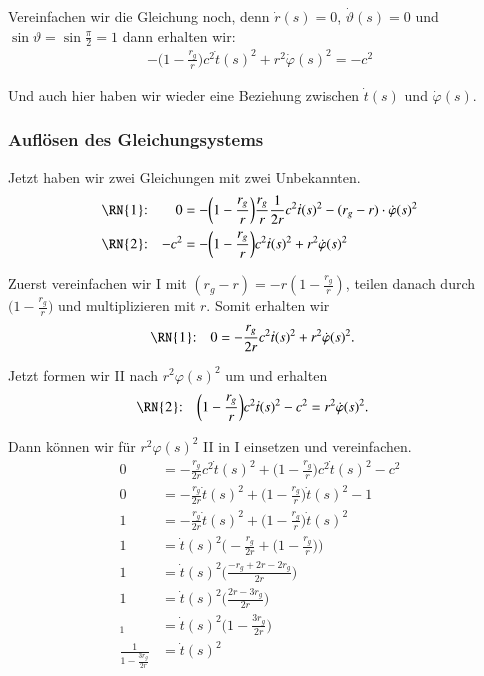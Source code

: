 \begin{refsection}
\noindent{}Vereinfachen wir die Gleichung noch, denn \( \dot r(s) = 0 \), \( \dot \vartheta(s) = 0 \) und \( \sin \vartheta = \sin \frac{\pi}{2} = 1 \) dann erhalten wir:
\begin{align*}
-\biggl(1-\frac{r_g}r\biggr)c^2 \dot t(s)^2 + r^2 \dot \varphi (s)^2 = -c^2 
\end{align*}

\noindent{}Und auch hier haben wir wieder eine Beziehung zwischen \( \dot t(s) \) und \( \dot \varphi(s) \). 

\subsubsection{Auflösen des Gleichungsystems}
Jetzt haben wir zwei Gleichungen mit zwei Unbekannten.
\begin{align*}
\text{\RN{1}:} &&
0 &= -\biggl(1-\frac{r_g}{r}\biggr)\frac{r_g}{r}\frac1{2r}c^2\dot t(s)^2 - (r_g-r)\cdot \dot \varphi(s)^2
\\
\text{\RN{2}:} &&
-c^2 &= -\biggl(1-\frac{r_g}r\biggr)c^2 \dot t(s)^2 + r^2 \dot \varphi (s)^2
\end{align*}

\noindent{}Zuerst vereinfachen wir \RN{1} mit $ (r_g - r) = -r (1 - \frac{r_g}{r} )$, teilen danach durch $\biggr( 1 - \frac{r_g}{r} \biggr)$ und multiplizieren mit $r$. Somit erhalten wir
\begin{align*}
\text{\RN{1}:} && 0 &= -\frac{r_g}{2r} c^2 \dot t(s)^2 + r^2 \dot \varphi(s)^2.
\end{align*}

\noindent{}Jetzt formen wir \RN{2} nach $ r^2 \varphi(s)^2$ um und erhalten 
\begin{align*}
\text{\RN{2}:} && \biggr( 1 - \frac{r_g}{r} \biggr) c^2 \dot t(s)^2 - c^2 &= r^2 \dot \varphi (s)^2.
\end{align*}

\noindent{}Dann können wir für $ r^2 \varphi(s)^2$ \RN{2} in \RN{1} einsetzen und vereinfachen.
\begin{align*}
0 &= -\frac{r_g}{2r} c^2 \dot t(s)^2 + \biggr( 1 - \frac{r_g}{r} \biggr) c^2 \dot t(s)^2 - c^2  
\\
0 &= -\frac{r_g}{2r}\dot t(s)^2 + \biggr( 1 - \frac{r_g}{r} \biggr) \dot t(s)^2 - 1 
\\
1 &= -\frac{r_g}{2r}\dot t(s)^2 + \biggr( 1 - \frac{r_g}{r} \biggr) \dot t(s)^2
\\
1 &= \dot t(s)^2 \biggr( -\frac{r_g}{2r} + \biggr( 1 - \frac{r_g}{r} \biggr) \biggr) 
\\
1 &= \dot t(s)^2 \biggr( \frac{-r_g + 2r - 2r_g}{2r}\biggr)
\\
1 &= \dot t(s)^2 \biggr( \frac{2r-3r_g}{2r}\biggr)
\\_
1 &= \dot t(s)^2 \biggr( 1 - \frac{3r_g}{2r}\biggr) 
\\
\frac{1}{ 1 - \frac{3r_g}{2r} } &= \dot t(s)^2 
\end{align*}


\end{refsection}
